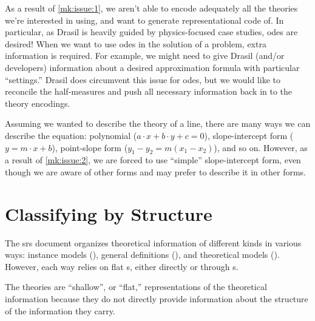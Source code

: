As a result of \ref{mk:issue:1}, we aren't able to encode adequately all the
theories we're interested in using, and want to generate representational code
of. In particular, as Drasil is heavily guided by physics-focused case studies,
\acsp{ode} are desired! When we want to use \acsp{ode} in the solution of a
problem, extra information is required. For example, we might need to give
Drasil (and/or developers) information about a desired approximation formula
with particular ``settings.'' Drasil does circumvent this issue for \acsp{ode},
but we would like to reconcile the half-measures and push all necessary
information back in to the theory encodings.

Assuming we wanted to describe the theory of a line, there are many ways we can
describe the equation: polynomial (\(a \cdot{} x + b \cdot{} y + c = 0\)),
slope-intercept form (\(y = m \cdot{} x + b\)), point-slope form (\(y_1 - y_2 =
m(x_1 - x_2)\)), and so on. However, as a result of \ref{mk:issue:2}, we are
forced to use ``simple'' slope-intercept form, even though we are aware of other
forms and may prefer to describe it in other forms.


\section{Classifying by Structure}
\label{chap:framing-theories:sec:classifying-and-structuring}








The \acs{srs} document organizes theoretical information of different kinds in
various ways: instance models (\InstanceModel{}), general definitions
(\GenDefn{}), and theoretical models (\TheoryModel{}). However, each way relies
on flat \Relation{}s, either directly or through \RelationConcept{}s.

The theories are ``shallow'', or ``flat,'' representations of the theoretical
information because they do not directly provide information about the structure
of the information they carry.


